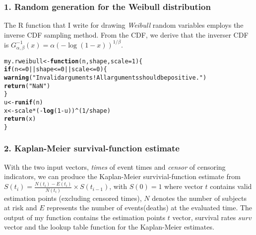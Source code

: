 \documentclass{article}\usepackage{graphicx, color}
\makeatletter
\newcommand{\hlfunctioncall}[1]{\textcolor[rgb]{0.501960784313725,0,0.329411764705882}{\textbf{#1}}}%
\newcommand{\hlstring}[1]{\textcolor[rgb]{0.6,0.6,1}{#1}}%
\newenvironment{kframe}{%
 \def\at@end@of@kframe{}%
 \ifinner\ifhmode%
  \def\at@end@of@kframe{\end{minipage}}%
  \begin{minipage}{\columnwidth}%
 \fi\fi%
 \def\FrameCommand##1{\hskip\@totalleftmargin \hskip-\fboxsep
 \colorbox{shadecolor}{##1}\hskip-\fboxsep
     \hskip-\linewidth \hskip-\@totalleftmargin \hskip\columnwidth}%
 \MakeFramed {\advance\hsize-\width
   \@totalleftmargin\z@ \linewidth\hsize
   \@setminipage}}%
 {\par\unskip\endMakeFramed%
 \at@end@of@kframe}
\newenvironment{knitrout}{}{} %
\makeatother
\begin{document}
\subsubsection*{1. Random generation for the Weibull distribution}
\hspace{12 pt} The R function that I write for drawing
\textit{Weibull} random variables employs the inverse CDF sampling
method. From the CDF, we derive that the inverser CDF is 
$G^{-1}_{\alpha , \beta}(x) = \alpha(-\log(1-x))^{1/\beta}$.

\begin{knitrout}
\color{fgcolor}\begin{kframe}
\begin{alltt}
my.rweibull <- \hlfunctioncall{function}(n, shape, scale = 1) \{
    \hlfunctioncall{if} (n <= 0 || shape <= 0 || scale <= 0) \{
        \hlfunctioncall{warning}(\hlstring{"Invalid arguments! All arguments should be positive."})
        \hlfunctioncall{return}(\hlstring{"NaN"})
    \}
    u <- \hlfunctioncall{runif}(n)
    x <- scale * (-\hlfunctioncall{log}(1 - u))^(1/shape)
    \hlfunctioncall{return}(x)
\}
\end{alltt}
\end{kframe}
\end{knitrout}


\subsubsection*{2. Kaplan-Meier survival-function estimate}
\hspace{12 pt} With the two input vectors, \textit{times} of event
times and \textit{censor} of censoring indicators, we can produce the
Kaplan-Meier survivial-function estimate from \newline
$\displaystyle S(t_i) = \frac{N(t_i)-E(t_i)}{N(t_i)} \times S(t_{i-1})$, 
with $S(0) = 1$ \newline
where vector $t$ contains valid estimation points (excluding censored
times), $N$ denotes the number of subjects at risk and $E$ represents
the number of events(deaths) at the evaluated time. The output of my
function contains the estimation points $t$ vector, survival rates
$surv$ vector and the lookup table function for the Kaplan-Meier estimates.
\end{document}
